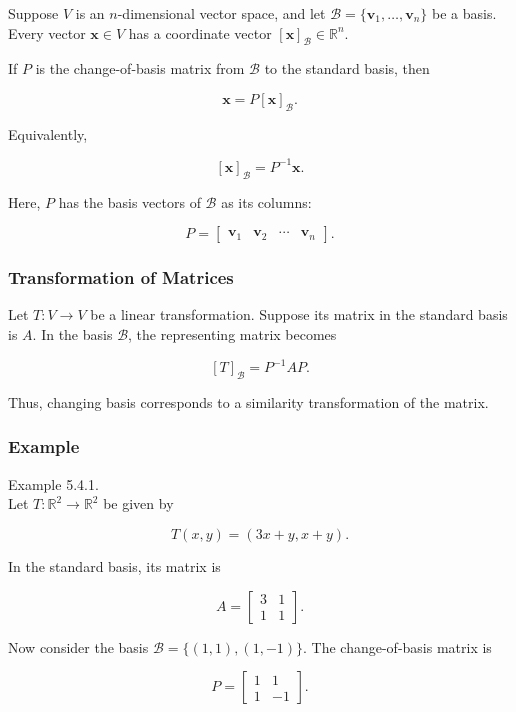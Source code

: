 \documentclass[
  12pt,
  a4paper,
]{article}
\begin{document}
Suppose \(V\) is an \(n\)-dimensional vector space, and let
\(\mathcal{B} = \{\mathbf{v}_1, \dots, \mathbf{v}_n\}\) be a basis.
Every vector \(\mathbf{x} \in V\) has a coordinate vector
\([\mathbf{x}]_{\mathcal{B}} \in \mathbb{R}^n\).

If \(P\) is the change-of-basis matrix from \(\mathcal{B}\) to the
standard basis, then

\[\mathbf{x} = P [\mathbf{x}]_{\mathcal{B}}.\]

Equivalently,

\[[\mathbf{x}]_{\mathcal{B}} = P^{-1} \mathbf{x}.\]

Here, \(P\) has the basis vectors of \(\mathcal{B}\) as its columns:

\[P = \begin{bmatrix}
\mathbf{v}_1 & \mathbf{v}_2 & \cdots & \mathbf{v}_n
\end{bmatrix}.\]

\subsubsection{Transformation of
Matrices}\label{transformation-of-matrices}

Let \(T: V \to V\) be a linear transformation. Suppose its matrix in the
standard basis is \(A\). In the basis \(\mathcal{B}\), the representing
matrix becomes

\[[T]_{\mathcal{B}} = P^{-1} A P.\]

Thus, changing basis corresponds to a similarity transformation of the
matrix.

\subsubsection{Example}\label{example-4}

Example 5.4.1.\\
Let \(T:\mathbb{R}^2 \to \mathbb{R}^2\) be given by

\[T(x,y) = (3x + y, x + y).\]

In the standard basis, its matrix is

\[A = \begin{bmatrix}
3 & 1 \\
1 & 1
\end{bmatrix}.\]

Now consider the basis \(\mathcal{B} = \{ (1,1), (1,-1) \}\). The
change-of-basis matrix is

\[P = \begin{bmatrix}
1 & 1 \\
1 & -1
\end{bmatrix}.\]
\end{document}
